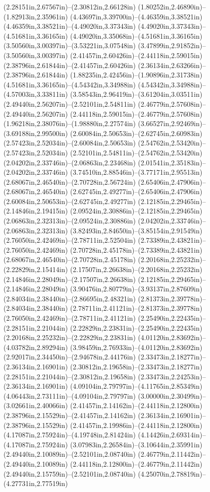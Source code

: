 (2.28151in,2.67567in)--(2.30812in,2.66128in) (1.80252in,2.46890in)--(1.82913in,2.35961in) (4.43697in,3.39700in)--(4.46359in,3.38521in) (4.46359in,3.38521in)--(4.49020in,3.37343in) (4.49020in,3.37343in)--(4.51681in,3.36165in) (4.49020in,3.35068in)--(4.51681in,3.36165in) (3.50560in,3.00397in)--(3.53221in,3.07548in) (3.47899in,2.91852in)--(3.50560in,3.00397in) (2.41457in,2.60426in)--(2.44118in,2.59015in) (2.38796in,2.61844in)--(2.41457in,2.60426in) (2.36134in,2.63266in)--(2.38796in,2.61844in) (1.88235in,2.42456in)--(1.90896in,2.31738in) (4.51681in,3.36165in)--(4.54342in,3.34988in) (4.54342in,3.34988in)--(4.57003in,3.33811in) (3.58543in,2.96419in)--(3.61204in,3.03511in) (2.49440in,2.56207in)--(2.52101in,2.54811in) (2.46779in,2.57608in)--(2.49440in,2.56207in) (2.44118in,2.59015in)--(2.46779in,2.57608in) (1.96218in,2.38076in)--(1.98880in,2.27574in) (3.66527in,2.92469in)--(3.69188in,2.99500in) (2.60084in,2.50653in)--(2.62745in,2.60983in) (2.57423in,2.52034in)--(2.60084in,2.50653in) (2.54762in,2.53420in)--(2.57423in,2.52034in) (2.52101in,2.54811in)--(2.54762in,2.53420in) (2.04202in,2.33746in)--(2.06863in,2.23468in) (2.01541in,2.35183in)--(2.04202in,2.33746in) (3.74510in,2.88546in)--(3.77171in,2.95513in) (2.68067in,2.46540in)--(2.70728in,2.56724in) (2.65406in,2.47906in)--(2.68067in,2.46540in) (2.62745in,2.49277in)--(2.65406in,2.47906in) (2.60084in,2.50653in)--(2.62745in,2.49277in) (2.12185in,2.29465in)--(2.14846in,2.19415in) (2.09524in,2.30886in)--(2.12185in,2.29465in) (2.06863in,2.32313in)--(2.09524in,2.30886in) (2.04202in,2.33746in)--(2.06863in,2.32313in) (3.82493in,2.84650in)--(3.85154in,2.91549in) (2.76050in,2.42469in)--(2.78711in,2.52504in) (2.73389in,2.43821in)--(2.76050in,2.42469in) (2.70728in,2.45178in)--(2.73389in,2.43821in) (2.68067in,2.46540in)--(2.70728in,2.45178in) (2.20168in,2.25232in)--(2.22829in,2.15414in) (2.17507in,2.26638in)--(2.20168in,2.25232in) (2.14846in,2.28049in)--(2.17507in,2.26638in) (2.12185in,2.29465in)--(2.14846in,2.28049in) (3.90476in,2.80779in)--(3.93137in,2.87609in) (2.84034in,2.38440in)--(2.86695in,2.48321in) (2.81373in,2.39778in)--(2.84034in,2.38440in) (2.78711in,2.41121in)--(2.81373in,2.39778in) (2.76050in,2.42469in)--(2.78711in,2.41121in) (2.25490in,2.22435in)--(2.28151in,2.21044in) (2.22829in,2.23831in)--(2.25490in,2.22435in) (2.20168in,2.25232in)--(2.22829in,2.23831in) (4.01120in,2.83692in)--(4.03782in,2.89294in) (3.98459in,2.76933in)--(4.01120in,2.83692in) (2.92017in,2.34450in)--(2.94678in,2.44176in) (2.33473in,2.18277in)--(2.36134in,2.16901in) (2.30812in,2.19658in)--(2.33473in,2.18277in) (2.28151in,2.21044in)--(2.30812in,2.19658in) (2.33473in,2.24253in)--(2.36134in,2.16901in) (4.09104in,2.79797in)--(4.11765in,2.85349in) (4.06443in,2.73111in)--(4.09104in,2.79797in) (3.00000in,2.30499in)--(3.02661in,2.40066in) (2.41457in,2.14162in)--(2.44118in,2.12800in) (2.38796in,2.15529in)--(2.41457in,2.14162in) (2.36134in,2.16901in)--(2.38796in,2.15529in) (2.41457in,2.19986in)--(2.44118in,2.12800in) (4.17087in,2.75924in)--(4.19748in,2.81424in) (4.14426in,2.69314in)--(4.17087in,2.75924in) (3.07983in,2.26584in)--(3.10644in,2.35991in) (2.49440in,2.10089in)--(2.52101in,2.08740in) (2.46779in,2.11442in)--(2.49440in,2.10089in) (2.44118in,2.12800in)--(2.46779in,2.11442in) (2.49440in,2.15759in)--(2.52101in,2.08740in) (4.25070in,2.78819in)--(4.27731in,2.77519in) 
